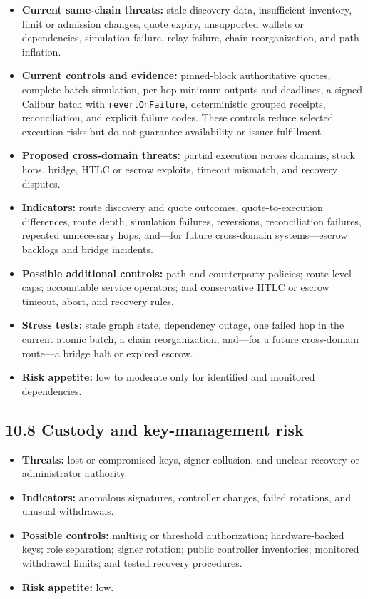 \documentclass[11pt]{article}
\begin{document}
\begin{itemize}[leftmargin=*]
\item \textbf{Current same-chain threats:} stale discovery data, insufficient inventory, limit or admission changes, quote expiry, unsupported wallets or dependencies, simulation failure, relay failure, chain reorganization, and path inflation.
\item \textbf{Current controls and evidence:} pinned-block authoritative quotes, complete-batch simulation, per-hop minimum outputs and deadlines, a signed Calibur batch with \texttt{revertOnFailure}, deterministic grouped receipts, reconciliation, and explicit failure codes. These controls reduce selected execution risks but do not guarantee availability or issuer fulfillment.
\item \textbf{Proposed cross-domain threats:} partial execution across domains, stuck hops, bridge, HTLC or escrow exploits, timeout mismatch, and recovery disputes.
\item \textbf{Indicators:} route discovery and quote outcomes, quote-to-execution differences, route depth, simulation failures, reversions, reconciliation failures, repeated unnecessary hops, and---for future cross-domain systems---escrow backlogs and bridge incidents.
\item \textbf{Possible additional controls:} path and counterparty policies; route-level caps; accountable service operators; and conservative HTLC or escrow timeout, abort, and recovery rules.
\item \textbf{Stress tests:} stale graph state, dependency outage, one failed hop in the current atomic batch, a chain reorganization, and---for a future cross-domain route---a bridge halt or expired escrow.
\item \textbf{Risk appetite:} low to moderate only for identified and monitored dependencies.
\end{itemize}
\subsection*{10.8 Custody and key-management risk}

\begin{itemize}[leftmargin=*]
\item \textbf{Threats:} lost or compromised keys, signer collusion, and unclear recovery or administrator authority.
\item \textbf{Indicators:} anomalous signatures, controller changes, failed rotations, and unusual withdrawals.
\item \textbf{Possible controls:} multisig or threshold authorization; hardware-backed keys; role separation; signer rotation; public controller inventories; monitored withdrawal limits; and tested recovery procedures.
\item \textbf{Risk appetite:} low.
\end{itemize}
\end{document}
